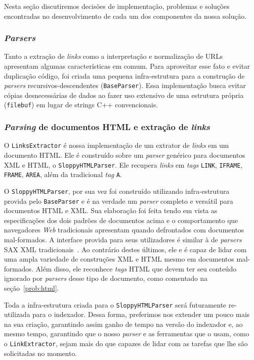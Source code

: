 \documentclass[10pt,twocolumn]{article}
\begin{document}
Nesta seção discutiremos decisões de implementação, problemas e soluções
encontradas no desenvolvimento de cada um dos componentes da nossa
solução.

\subsubsection{\emph{Parsers}}

Tanto a extração de \emph{links} como a interpretação e normalização de
URLs apresentam algumas características em comum. Para aproveitar esse
fato e evitar duplicação código, foi criada uma pequena infra-estrutura para
a construção de \emph{parsers} recursivos-descendentes
(\texttt{BaseParser}). Essa implementação busca evitar cópias
desnecessárias de dados ao fazer uso extensivo de uma estrutura própria
(\texttt{filebuf}) em lugar de strings C++ convencionais.

\subsubsection{\emph{Parsing} de documentos HTML e extração de
\emph{links}}

O \texttt{LinksExtractor} é nossa implementação de um extrator de
\emph{links} em um documento HTML. Ele é construído sobre um
\emph{parser} genérico para documentos XML e HTML, o
\texttt{SloppyHTMLParser}. Ele recupera \emph{links} em \emph{tags}
\texttt{LINK}, \texttt{IFRAME}, \texttt{FRAME}, \texttt{AREA}, além da
tradicional \emph{tag} \texttt{A}.

O \texttt{SloppyHTMLParser}, por sua vez foi construído utilizando
infra-estrutura provida pelo \texttt{BaseParser} e é na verdade um
\emph{parser} completo e versátil para documentos HTML e XML. Sua
elaboração foi feita tendo em vista as especificações dos dois padrões
de documentos acima e o comportamento que navegadores \emph{Web}
tradicionais apresentam quando defrontados com documentos mal-formados.
A interface provida para seus utilizadores é similar à de \emph{parsers}
SAX XML tradicionais~\cite{saxxml, bray2006xml, html4tr}. Ao contrário
destes últimos, ele e é capaz de lidar com uma ampla variedade de
construções XML e HTML mesmo em documentos
mal-formados. Além disso, ele reconhece \emph{tags} HTML que devem ter
seu conteúdo ignorado por \emph{parsers} desse tipo de documento, como
comentado na seção~\ref{prob:html}.

Toda a infra-estrutura criada para o \texttt{SloppyHTMLParser} será
futuramente re-utilizada para o indexador. Dessa forma, preferimos nos
extender um pouco mais na sua criação, garantindo assim ganho de tempo
na versão do indexador e, ao mesmo tempo, garantindo que o nosso
\emph{parser} e as ferramentas que o usam, como o
\texttt{LinkExtractor},  sejam mais do que capazes de lidar com as
tarefas que lhe são solicitadas no momento.
\end{document}
